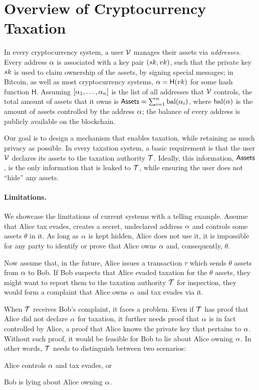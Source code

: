 \section{Overview of Cryptocurrency Taxation}\label{sec:taxation}

In every cryptocurrency system, a user $\mathcal{V}$ manages their assets via
\emph{addresses}. Every address $\alpha$ is associated with a key pair
$(sk, vk)$, such that the private key $sk$ is used to claim ownership of
the assets, \eg by signing special messages; in Bitcoin, as well as most
cryptocurrency systems, $\alpha = \mathsf{H}(vk)$ for some hash
function $\mathsf{H}$. Assuming $[\alpha_1, \dots, \alpha_n]$ is the list
of all addresses that $\mathcal{V}$ controls, the total amount of assets that it owns
is $\mathsf{Assets} = \sum_{i=1}^n \text{bal}(\alpha_i)$, where $\text{bal}(\alpha)$ is
the amount of assets controlled by the address $\alpha$; the balance of every
address is publicly available on the blockchain.

Our goal is to design a mechanism that enables taxation, while retaining as
much privacy as possible. In every taxation system, a basic requirement is that
the user $\mathcal{V}$ declares its assets to the taxation authority $\mathcal{T}$.
Ideally, this information, \ie $\mathsf{Assets}$, is the only information that is
leaked to $\mathcal{T}$, while ensuring the user does not ``hide'' any assets.

\paragraph{Limitations.}\label{subsec:limitations}

We showcase the limitations of current systems with a telling example.  Assume
that Alice tax evades, \ie creates a secret, undeclared address $\alpha$ and
controls some assets $\theta$ in it. As long as $\alpha$ is kept hidden, \ie
Alice does not use it, it is impossible for any party to identify or prove that
Alice owns $\alpha$ and, consequently, $\theta$.

Now assume that, in the future, Alice issues a transaction $\tau$ which
sends $\theta$ assets from $\alpha$ to Bob. If Bob suspects that Alice evaded
taxation for the $\theta$ assets, they might want to report them to the
taxation authority $\mathcal{T}$ for inspection, \ie they would form a complaint
that Alice owns $\alpha$ and tax evades via it.

When $\mathcal{T}$ receives Bob's complaint, it faces a problem. Even if
$\mathcal{T}$ has proof that Alice did not declare $\alpha$ for taxation, it
further needs proof that $\alpha$ is in fact controlled by Alice, \ie a proof
that Alice knows the private key that pertains to $\alpha$. Without such
proof, it would be feasible for Bob to lie about Alice owning $\alpha$. In
other words, $\mathcal{T}$ needs to distinguish between two scenarios:
\begin{inparaenum}[i)]
    \item Alice controls $\alpha$ and tax evades, or
    \item Bob is lying about Alice owning $\alpha$.
\end{inparaenum}

